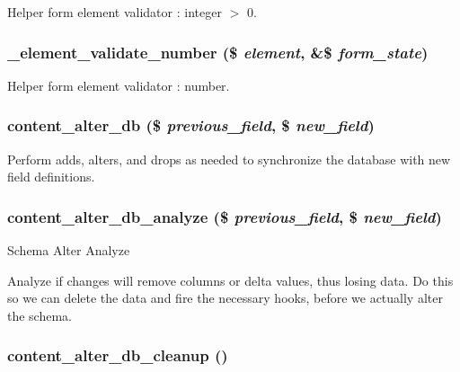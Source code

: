 Helper form element validator : integer $>$ 0. \hypertarget{content_8admin_8inc_95595f737604fea8bffc695d064f2b67}{
\subsubsection[{\_\-element\_\-validate\_\-number}]{\setlength{\rightskip}{0pt plus 5cm}\_\-element\_\-validate\_\-number (\$ {\em element}, \/  \&\$ {\em form\_\-state})}}
\label{content_8admin_8inc_95595f737604fea8bffc695d064f2b67}


Helper form element validator : number. \hypertarget{content_8admin_8inc_0ff88199fd38c8a5b07f76aa3f0086a0}{
\subsubsection[{content\_\-alter\_\-db}]{\setlength{\rightskip}{0pt plus 5cm}content\_\-alter\_\-db (\$ {\em previous\_\-field}, \/  \$ {\em new\_\-field})}}
\label{content_8admin_8inc_0ff88199fd38c8a5b07f76aa3f0086a0}


Perform adds, alters, and drops as needed to synchronize the database with new field definitions. \hypertarget{content_8admin_8inc_3f2d33aff98deebf0ba30119ac7aeea8}{
\subsubsection[{content\_\-alter\_\-db\_\-analyze}]{\setlength{\rightskip}{0pt plus 5cm}content\_\-alter\_\-db\_\-analyze (\$ {\em previous\_\-field}, \/  \$ {\em new\_\-field})}}
\label{content_8admin_8inc_3f2d33aff98deebf0ba30119ac7aeea8}


Schema Alter Analyze

Analyze if changes will remove columns or delta values, thus losing data. Do this so we can delete the data and fire the necessary hooks, before we actually alter the schema. \hypertarget{content_8admin_8inc_6dc8d87b2a3af1ccff3e9037c228f313}{
\subsubsection[{content\_\-alter\_\-db\_\-cleanup}]{\setlength{\rightskip}{0pt plus 5cm}content\_\-alter\_\-db\_\-cleanup ()}}
\label{content_8admin_8inc_6dc8d87b2a3af1ccff3e9037c228f313}


